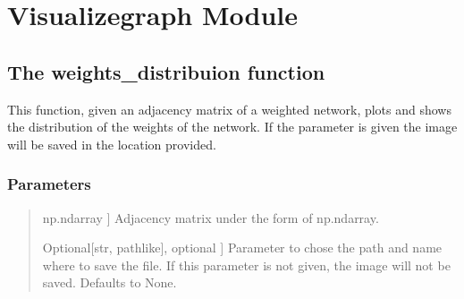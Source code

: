 \documentclass[letterpaper,10pt,english]{sphinxmanual}
\begin{document}
\chapter{Visualizegraph Module}
\label{\detokenize{index:visualizegraph-module}}

\section{The weights\_distribuion function}
\label{\detokenize{index:the-weights-distribuion-function}}

\begin{fulllineitems}
\label{\detokenize{index:hicanalysis.visualizegraph.weights_distribuion}}
\pysigstartsignatures
{}
\pysigstopsignatures
\sphinxAtStartPar
This function, given an adjacency matrix of a weighted network, plots and shows 
the distribution of the weights of the network. If the parameter  is given 
the image will be saved in the location provided.


\subsection{Parameters}
\label{\detokenize{index:id13}}\begin{quote}
\begin{description}
\sphinxlineitem{matrix}{[}np.ndarray {]}
\sphinxAtStartPar
Adjacency matrix under the form of np.ndarray.

\sphinxlineitem{savepath}{[}Optional{[}str, path\sphinxhyphen{}like{]}, optional {]}
\sphinxAtStartPar
Parameter to chose the path and name where to save the file. If this
parameter is not given, the image will not be saved. Defaults to None.

\end{description}
\end{quote}

\end{fulllineitems}
\end{document}
